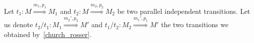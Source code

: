 

Let $t_1:M\overset{m_1,p_1}{\Rightarrow} M_1$ and $t_2:M\overset{m_2,p_2}{\Rightarrow} M_2$ be two parallel independent transitions. Let us denote $t_2/t_1:M_1\overset{m_2',p_2}{\Rightarrow} M'$ and $t_1/t_2:M_2\overset{m_1',p_1}{\Rightarrow} M'$ the two transitions we obtained by~\autoref{church_rosser}.


